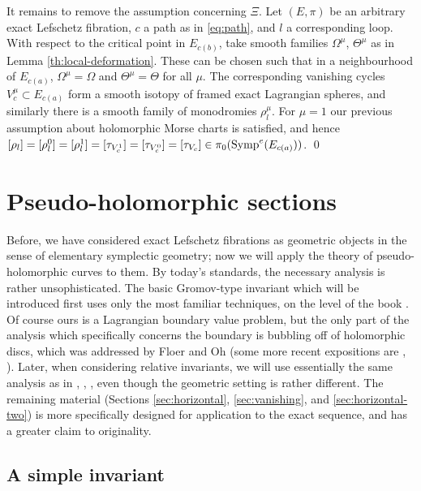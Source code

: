 \documentclass[10pt,letterpaper]{article}
\begin{document}
It remains to remove the assumption concerning $\Xi$. Let $(E,\pi)$ be an
arbitrary exact Lefschetz fibration, $c$ a path as in \eqref{eq:path}, and $l$
a corresponding loop. With respect to the critical point in $E_{c(b)}$, take
smooth families $\Omega^\mu$, $\Theta^\mu$ as in Lemma
\ref{th:local-deformation}. These can be chosen such that in a neighbourhood of
$E_{c(a)}$, $\Omega^\mu = \Omega$ and $\Theta^\mu = \Theta$ for all $\mu$. The
corresponding vanishing cycles $V^\mu_c \subset E_{c(a)}$ form a smooth isotopy
of framed exact Lagrangian spheres, and similarly there is a smooth family of
monodromies $\rho_l^{\mu}$. For $\mu = 1$ our previous assumption about
holomorphic Morse charts is satisfied, and hence $[\rho_l] = [\rho_l^0] =
[\rho_l^1] = [\tau_{V^1_c}] = [\tau_{V^0_c}] = [\tau_{V_c}] \in
\pi_0(\mathrm{Symp}^e(E_{c(a)}))$. \qed

\newpage
%
\section[Sections]{Pseudo-holomorphic sections\label{ch:two}}

Before, we have considered exact Lefschetz fibrations as geometric
objects in the sense of elementary symplectic geometry; now we will
apply the theory of pseudo-holomorphic curves to them. By today's
standards, the necessary analysis is rather unsophisticated. The
basic Gromov-type invariant which will be introduced first uses only
the most familiar techniques, on the level of the book
\cite{mcduff-salamon}. Of course ours is a Lagrangian boundary value
problem, but the only part of the analysis which specifically
concerns the boundary is bubbling off of holomorphic discs, which was
addressed by Floer \cite{floer88c} and Oh \cite{oh92} (some more
recent expositions are \cite[Section A.4.3]{ivashkovich-shevchishin},
\cite{frauenfelder01}). Later, when considering relative invariants,
we will use essentially the same analysis as in \cite{schwarz95},
\cite{piunikhin-salamon-schwarz94}, \cite{desilva98}, even though the
geometric setting is rather different. The remaining material
(Sections \ref{sec:horizontal}, \ref{sec:vanishing}, and
\ref{sec:horizontal-two}) is more specifically designed for
application to the exact sequence, and has a greater claim to
originality.

\subsection{A simple invariant\label{sec:simple-invariant}}
\end{document}
